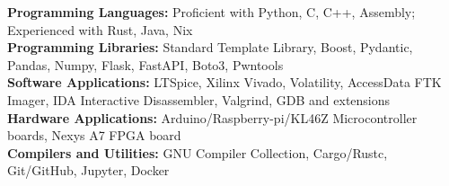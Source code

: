 \textbf{Programming Languages:} Proficient with Python, C, C++, Assembly; Experienced with Rust, Java, Nix\\
\textbf{Programming Libraries:} Standard Template Library, Boost, Pydantic, Pandas, Numpy, Flask, FastAPI, Boto3, Pwntools\\
\textbf{Software Applications:} LTSpice, Xilinx Vivado, Volatility, AccessData FTK Imager, IDA Interactive Disassembler, Valgrind, GDB and extensions\\
\textbf{Hardware Applications:} Arduino/Raspberry-pi/KL46Z Microcontroller boards, Nexys A7 FPGA board\\
\textbf{Compilers and Utilities:} GNU Compiler Collection, Cargo/Rustc, Git/GitHub, Jupyter, Docker
